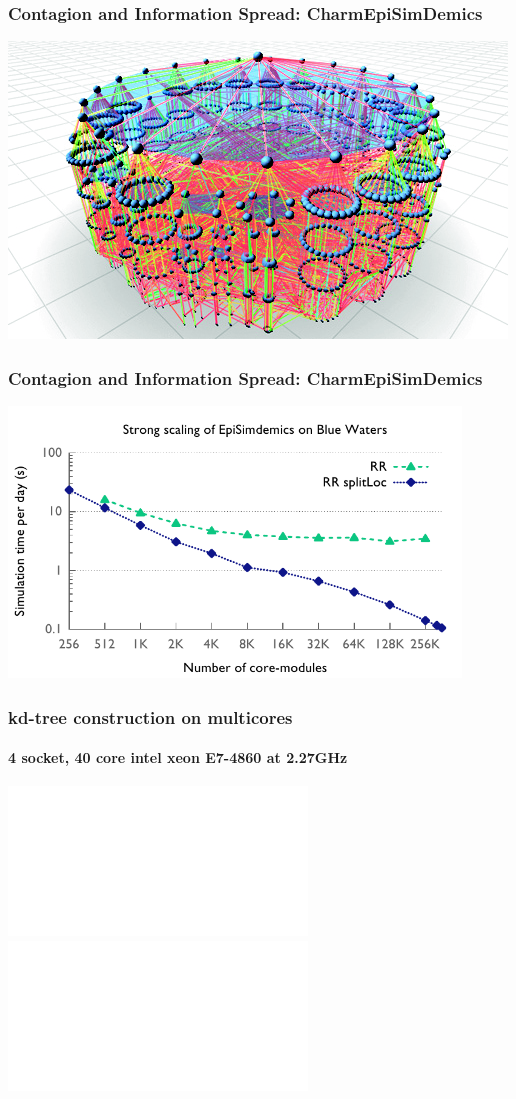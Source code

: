\begin{frame}
\frametitle{Contagion and Information Spread: CharmEpiSimDemics}
\includegraphics[width=\textwidth]{../figures/contagion.png}
\end{frame}


\begin{frame}
\frametitle{Contagion and Information Spread: CharmEpiSimDemics}
\begin{center}
\includegraphics[width=0.9\textwidth]{../figures/simdemics_strong_scaling.pdf}
\end{center}
\end{frame}


\begin{frame}
\frametitle{kd-tree construction on multicores}
\framesubtitle{4 socket, 40 core intel xeon E7-4860 at 2.27GHz}
\includegraphics<1>[height=\textheight]{../figures/kdtree/speedup_8.pdf}
\includegraphics<2>[height=\textheight]{../figures/kdtree/speedup_15.pdf}
\end{frame}


